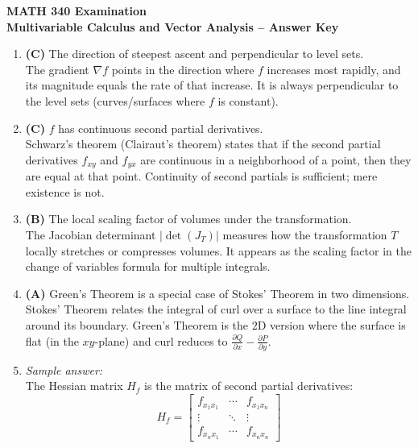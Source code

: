 \documentclass[11pt]{article}
\begin{document}
\begin{center}
  {\Large \textbf{MATH 340 Examination}}\\[0.25em]
  {\large \textbf{Multivariable Calculus and Vector Analysis -- Answer Key}}\\[0.5em]
\end{center}

\begin{enumerate}[label=\textbf{\arabic*.}]

  \item \textbf{(C)} The direction of steepest ascent and perpendicular to level sets.\\
  The gradient $\nabla f$ points in the direction where $f$ increases most rapidly, and its magnitude 
  equals the rate of that increase. It is always perpendicular to the level sets (curves/surfaces where 
  $f$ is constant).

  \item \textbf{(C)} $f$ has continuous second partial derivatives.\\
  Schwarz's theorem (Clairaut's theorem) states that if the second partial derivatives $f_{xy}$ and 
  $f_{yx}$ are continuous in a neighborhood of a point, then they are equal at that point. Continuity 
  of second partials is sufficient; mere existence is not.

  \item \textbf{(B)} The local scaling factor of volumes under the transformation.\\
  The Jacobian determinant $|\det(J_T)|$ measures how the transformation $T$ locally stretches or 
  compresses volumes. It appears as the scaling factor in the change of variables formula for 
  multiple integrals.

  \item \textbf{(A)} Green's Theorem is a special case of Stokes' Theorem in two dimensions.\\
  Stokes' Theorem relates the integral of curl over a surface to the line integral around its boundary. 
  Green's Theorem is the $2$D version where the surface is flat (in the $xy$-plane) and curl reduces 
  to $\frac{\partial Q}{\partial x} - \frac{\partial P}{\partial y}$.

  \item \emph{Sample answer:}\\
  The Hessian matrix $H_f$ is the matrix of second partial derivatives:
  $$H_f = \begin{bmatrix} f_{x_1x_1} & \cdots & f_{x_1x_n} \\ \vdots & \ddots & \vdots \\ 
  f_{x_nx_1} & \cdots & f_{x_nx_n} \end{bmatrix}$$


\end{enumerate}
\end{document}
